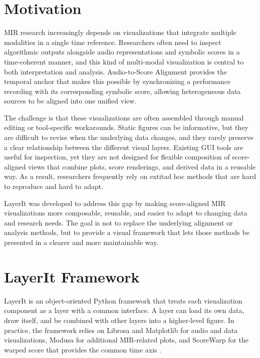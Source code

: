 \documentclass{article}
\begin{document}
\section{Motivation}
MIR research increasingly depends on visualizations that integrate multiple modalities in a single time reference. Researchers often need to inspect algorithmic outputs alongside audio representations and symbolic scores in a time-coherent manner, and this kind of multi-modal visualization is central to both interpretation and analysis. Audio-to-Score Alignment provides the temporal anchor that makes this possible by synchronizing a performance recording with its corresponding symbolic score, allowing heterogeneous data sources to be aligned into one unified view.

The challenge is that these visualizations are often assembled through manual editing or tool-specific workarounds. Static figures can be informative, but they are difficult to revise when the underlying data changes, and they rarely preserve a clear relationship between the different visual layers. Existing GUI tools are useful for inspection, yet they are not designed for flexible composition of score-aligned views that combine plots, score renderings, and derived data in a reusable way. As a result, researchers frequently rely on 	extit{ad hoc} methods that are hard to reproduce and hard to adapt.

LayerIt was developed to address this gap by making score-aligned MIR visualizations more composable, reusable, and easier to adapt to changing data and research needs. The goal is not to replace the underlying alignment or analysis methods, but to provide a visual framework that lets those methods be presented in a clearer and more maintainable way.

\section{LayerIt Framework}

LayerIt is an object-oriented Python framework that treats each visualization component as a layer with a common interface. A layer can load its own data, draw itself, and be combined with other layers into a higher-level figure. In practice, the framework relies on Librosa and Matplotlib for audio and data visualizations, Modusa for additional MIR-related plots, and ScoreWarp for the warped score that provides the common time axis \cite{mcfeeLibrosaLibrosa01102025,thematplotlibdevelopmentteamMatplotlibVisualizationPython2026,modusa,goeblLetsScoreWarpAgain2025a}.
\end{document}
